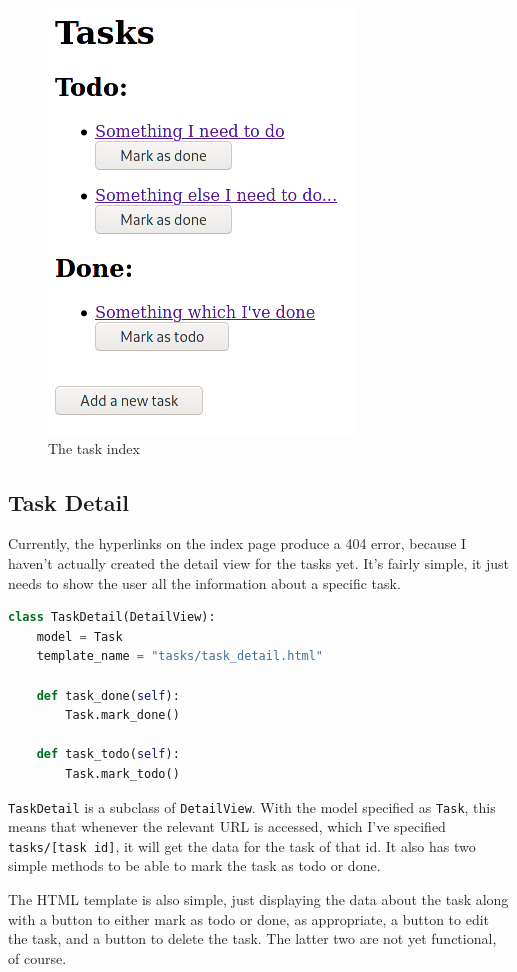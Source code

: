 \documentclass{article}
\begin{document}
\begin{figure}[H]
	\centering
	\includegraphics[width=0.6\linewidth]{Screenshots/task_index.png}
	\caption{The task index}
	\label{fig:task_index1}
\end{figure}

\subsection{Task Detail}
Currently,
the hyperlinks on the index page produce a 404 error,
because I haven't actually created the detail view for the tasks yet.
It's fairly simple,
it just needs to show the user all the information about a specific task.

\begin{lstlisting}[language=Python, breaklines]
class TaskDetail(DetailView):
    model = Task
    template_name = "tasks/task_detail.html"

    def task_done(self):
        Task.mark_done()

    def task_todo(self):
        Task.mark_todo()
\end{lstlisting}

\texttt{TaskDetail} is a subclass of \texttt{DetailView}.
With the model specified as \texttt{Task},
this means that whenever the relevant URL is accessed,
which I've specified \texttt{tasks/[task id]},
it will get the data for the task of that id.
It also has two simple methods to be able to mark the task as todo or done.

The HTML template is also simple,
just displaying the data about the task along with a button to either mark as todo or done,
as appropriate,
a button to edit the task,
and a button to delete the task.
The latter two are not yet functional,
of course.
\end{document}
